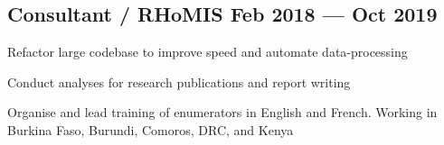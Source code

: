\documentclass[letter,10pt]{article}
\begin{document}
\subsection{{Consultant / RHoMIS \hfill Feb 2018 --- Oct 2019}}
\begin{zitemize}
\item Refactor large codebase to improve
speed and automate data-processing
\item Conduct analyses for research publications and report writing
\item Organise and lead training of enumerators in English and 
French. Working in Burkina Faso, Burundi, Comoros, DRC, and Kenya
\end{zitemize}
\end{document}
